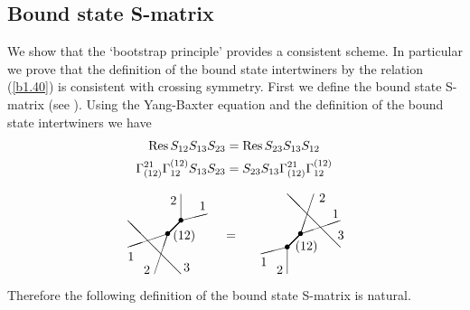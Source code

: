 \documentclass[a4paper,a4paper]{article}
\begin{document}
\subsection{Bound state S-matrix}

We show that the `bootstrap principle' provides a consistent scheme. In
particular we prove that the definition of the bound state intertwiners by
the relation (\ref{b1.40}) is consistent with crossing symmetry. First we
define the bound state S-matrix (see \cite{K1}). Using the Yang-Baxter
equation and the definition of the bound state intertwiners we have 
\begin{gather*}
\mathop{\rm Res}S_{12}S_{13}S_{23}=\mathop{\rm Res}S_{23}S_{13}S_{12} \\
\Gamma _{(12)}^{21}\Gamma _{12}^{(12)}S_{13}S_{23}=S_{23}S_{13}\Gamma
_{(12)}^{21}\Gamma _{12}^{(12)} \\
\unitlength=7.4mm\begin{picture}(8,3.4) \put(1,0){\line(1,3){.5}}
\put(1.5,1.5){\line(-3,-1){1.5}} \put(2,0){\line(-1,1){2}}
\put(2,2){\line(4,1){1}} \put(2,3){\line(0,-1){1}} \put(0,.5){1}
\put(.6,0){2} \put(2.1,.1){3} \put(1.7,1.3){(12)} \put(2.7,2.4){1}
\put(1.6,2.6){2} \put(3.7,1.3){=} \put(6,0){\line(0,1){1}}
\put(6,1){\line(-4,-1){1}} \put(8,1){\line(-1,1){2}}
\put(6.5,1.5){\line(3,1){1.5}} \put(7,3){\line(-1,-3){.5}} \put(5,.3){1}
\put(5.6,0){2} \put(7.9,1.3){3} \put(6.3,.9){(12)} \put(7.7,2.1){1}
\put(7.2,2.7){2} \put(1.5,1.5){\makebox(0,0){$\bullet$}}
\put(2,2){\makebox(0,0){$\bullet$}} \put(6,1){\makebox(0,0){$\bullet$}}
\put(6.5,1.5){\makebox(0,0){$\bullet$}} \thicklines
\put(1.5,1.5){\line(1,1){.5}} \put(6,1){\line(1,1){.5}} \end{picture}
\end{gather*}
Therefore the following definition of the bound state S-matrix is natural.
\end{document}
